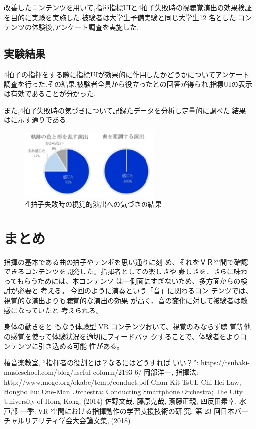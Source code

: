 \documentclass[uplatex]{jsarticle}   %
\begin{document}
改善したコンテンツを用いて,指揮指標UIと4拍子失敗時の視聴覚演出の効果検証を目的に実験を実施した.被験者は大学生予備実験と同じ大学生12 名とした.コンテンツの体験後,アンケート調査を実施した.


\subsection{実験結果}
4拍子の指揮をする際に指標UIが効果的に作用したかどうかについてアンケート調査を行った.その結果,被験者全員から役立ったとの回答が得られ,指標UIの表示は有効であることが分かった. 

また,4拍子失敗時の気づきについて記録たデータを分析し定量的に調べた.結果はに示す通りである.

\begin{figure}[t]
 \centering
 \includegraphics[clip,width=7cm]{miss.png}
 \caption{４拍子失敗時の視覚的演出への気づきの結果}\label{fig:miss}
\end{figure}

\section{まとめ}
指揮の基本である曲の拍子やテンポを思い通りに刻 め、それをＶＲ空間で確認できるコンテンツを開発した。指揮者としての楽しさや 難しさを、さらに味わってもらうためには、本コンテンツ は一側面にすぎないため、多方面からの検討が必要と 考える。 
今回のように演奏という「音」に関わるコン テンツでは、視覚的な演出よりも聴覚的な演出の効果 が高く、音の変化に対して被験者は敏感になっていたと 考えられる。

身体の動きをと もなう体験型 VR コンテンツおいて、視覚のみならず聴 覚等他の感覚を使って体験状況を適切にフィードバッ クすることで、体験者をよりコンテンツに引き込める可能 性がある。 

\begin{thebibliography}{9}
   椿音楽教室, “指揮者の役割とは？なるにはどうすれば いい？”: 
https://tsubaki-musicschool.com/blog/useful-column/2193 6/
 岡部洋一, 指揮法:  
http://www.moge.org/okabe/temp/conduct.pdf 
 Chun Kit TsUI, Chi Hei Law, Hongbo Fu: One-Man  Orchestra: Conducting Smartphone Orchestra; The City  University of Hong Kong, (2014) 
 佐野文哉, 藤原克哉, 斎藤正親, 四反田素幸, 水戸部 一季: VR 空間における指揮動作の学習支援技術の研 究; 第 23 回日本バーチャルリアリティ学会大会論文集, (2018) 
\end{thebibliography}
\end{document}
